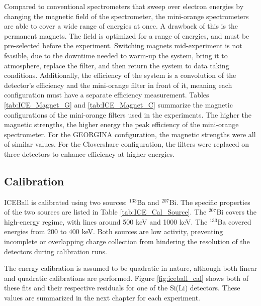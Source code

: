

Compared to conventional spectrometers that sweep over electron energies by changing the magnetic field of the spectrometer, the mini-orange spectrometers are able to cover a wide range of energies at once. A drawback of this is the permanent magnets. The field is optimized for a range of energies, and must be pre-selected before the experiment. Switching magnets mid-experiment is not feasible, due to the downtime needed to warm-up the system, bring it to atmosphere, replace the filter, and then return the system to data taking conditions. Additionally, the efficiency of the system is a convolution of the detector's efficiency and the mini-orange filter in front of it, meaning each configuration must have a separate efficiency measurement. Tables \ref{tab:ICE_Magnet_G} and \ref{tab:ICE_Magnet_C} summarize the magnetic configurations of the mini-orange filters used in the experiments. The higher the magnetic strengths, the higher energy the peak efficiency of the mini-orange spectrometer. For the GEORGINA configuration, the magnetic strengths were all of similar values. For the Clovershare configuration, the filters were replaced on three detectors to enhance efficiency at higher energies.





\subsection{Calibration}

ICEBall is calibrated using two sources: $^{133}$Ba and $^{207}$Bi. The specific properties of the two sources are listed in Table \ref{tab:ICE_Cal_Source}. The $^{207}$Bi covers the high-energy regime, with lines around 500 keV and 1000 keV. The $^{133}$Ba covered energies from 200 to 400 keV. Both sources are low activity, preventing incomplete or overlapping charge collection from hindering the resolution of the detectors during calibration runs. 



The energy calibration is assumed to be quadratic in nature, although both linear and quadratic calibrations are performed. Figure \ref{fig:iceball_cal} shows both of these fits and their respective residuals for one of the Si(Li) detectors. These values are summarized in the next chapter for each experiment.

